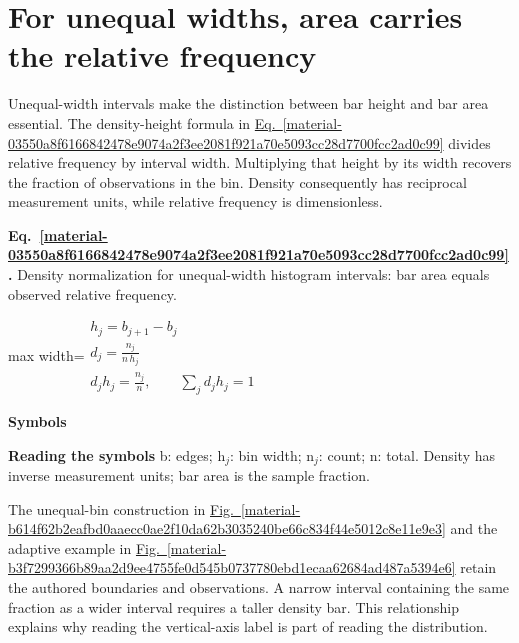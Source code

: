\documentclass[11pt,a4paper]{article}
\begin{document}
\medskip

\clearpage
\section{For unequal widths, area carries the relative frequency}
Unequal-width intervals make the distinction between bar height and bar area essential. The density-height formula in \hyperref[material-03550a8f6166842478e9074a2f3ee2081f921a70e5093cc28d7700fcc2ad0c99]{Eq.~\ref*{material-03550a8f6166842478e9074a2f3ee2081f921a70e5093cc28d7700fcc2ad0c99}} divides relative frequency by interval width. Multiplying that height by its width recovers the fraction of observations in the bin. Density consequently has reciprocal measurement units, while relative frequency is dimensionless.


\par\medskip
\begin{samepage}
\label{material-03550a8f6166842478e9074a2f3ee2081f921a70e5093cc28d7700fcc2ad0c99}
\noindent\textbf{Eq.~\ref*{material-03550a8f6166842478e9074a2f3ee2081f921a70e5093cc28d7700fcc2ad0c99}.} Density normalization for unequal-width histogram intervals: bar area equals observed relative frequency.\par\nopagebreak
\begin{center}\begin{adjustbox}{max width=\linewidth}$\displaystyle \begin{gathered}h_j=b_{j+1}-b_j\\d_j=\frac{n_j}{n\,h_j}\\d_jh_j=\frac{n_j}{n},\qquad\sum_j d_jh_j=1\end{gathered}$\end{adjustbox}\end{center}

\par\noindent\textbf{Symbols}

\par\noindent\textbf{Reading the symbols} b: edges; h\ensuremath{{}_j}: bin width; n\ensuremath{{}_j}: count; n: total. Density has inverse measurement units; bar area is the sample fraction.

\end{samepage}
\medskip

The unequal-bin construction in \hyperref[material-b614f62b2eafbd0aaecc0ae2f10da62b3035240be66c834f44e5012c8e11e9e3]{Fig.~\ref*{material-b614f62b2eafbd0aaecc0ae2f10da62b3035240be66c834f44e5012c8e11e9e3}} and the adaptive example in \hyperref[material-b3f7299366b89aa2d9ee4755fe0d545b0737780ebd1ecaa62684ad487a5394e6]{Fig.~\ref*{material-b3f7299366b89aa2d9ee4755fe0d545b0737780ebd1ecaa62684ad487a5394e6}} retain the authored boundaries and observations. A narrow interval containing the same fraction as a wider interval requires a taller density bar. This relationship explains why reading the vertical-axis label is part of reading the distribution.
\end{document}
